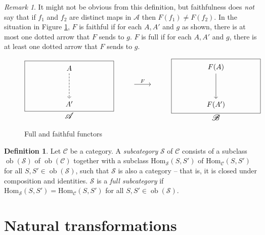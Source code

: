 \documentclass[10pt,oneside]{book}
\def\~#1{\mathscr{#1}}
\newcommand{\quadd}{\quad\quad}
\newcommand{\ob}{\mathop{\mathrm{ob}}}
\newcommand{\Hom}{\mathrm{Hom}}
\theoremstyle{plain}
\theoremstyle{definition}
\newtheorem{defn}[thm]{Definition}
\theoremstyle{remark}
\newtheorem*{rmk}{Remark}
\numberwithin{equation}{section}
\numberwithin{figure}{section}
\begin{document}
\begin{rmk}
    It might not be obvious from this definition, but faithfulness does \emph{not} say that if $f_1$ and $f_2$ are distinct maps in $\~A$ then $F(f_1) \neq F(f_2)$. In the situation in Figure \ref{fig:full_faithful}, $F$ is faithful if for each $A, A'$ and $g$ as shown, there is at most one dotted arrow that $F$ sends to $g$. $F$ is full if for each $A, A'$ and $g$, there is at least one dotted arrow that $F$ sends to $g$.
\end{rmk}

\begin{figure}[h]
    \centering
        \[
            \underset{\mbox{\large $\~A$}}{
                \framebox[1.75in]{
                    \begin{tikzcd}
                    A \\
                    \\
                    {A'}
                    \arrow[dashed, from=1-1, to=3-1]
                    \end{tikzcd}                   
                }
            }
            \quadd \begin{tikzcd}
            {} & {}
            \arrow["F", from=1-1, to=1-2]
            \end{tikzcd} \quadd
            \underset{\mbox{\large $\~B$}}{
                \framebox[1.75in]{
                    \begin{tikzcd}
                    F(A) \\
                    \\
                    {F(A')}
                    \arrow[from=1-1, to=3-1]
                    \end{tikzcd}                   
                }
            }
        \]
    \caption{Full and faithful functors}
    \label{fig:full_faithful}
\end{figure}

\begin{defn}
    Let $\~C$ be a category. A \emph{subcategory} $\~S$ of $\~C$ consists of a subclass $\ob(\~S)$ of $\ob(\~C)$ together with a subclass $\Hom_\~S(S, S')$ of $\Hom_\~C(S, S')$ for all $S, S' \in \ob(\~S)$, such that $\~S$ is also a category -- that is, it is closed under composition and identities. $\~S$ is a \emph{full subcategory} if $\Hom_\~S(S, S') = \Hom_\~C(S, S')$ for all $S, S' \in \ob(\~S)$.
\end{defn}

\section{Natural transformations}
\end{document}
